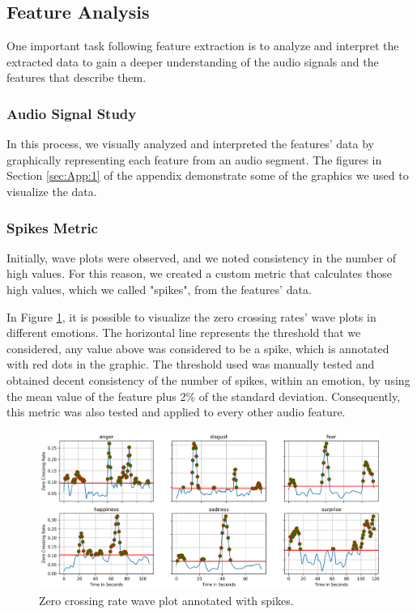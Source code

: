 \subsection{Feature Analysis}

One important task following feature extraction is to analyze and interpret the extracted data to gain a deeper understanding of the audio signals and the features that describe them.

\subsubsection{Audio Signal Study}

In this process, we visually analyzed and interpreted the features' data by graphically representing each feature from an audio segment. The figures in Section \ref{sec:App:1} of the appendix demonstrate some of the graphics we used to visualize the data.

\subsubsection{Spikes Metric}

Initially, wave plots were observed, and we noted consistency in the number of high values. For this reason, we created a custom metric that calculates those high values, which we called "spikes", from the features' data.

In Figure \ref{fig:zcrSpikes}, it is possible to visualize the zero crossing rates' wave plots in different emotions. The horizontal line represents the threshold that we considered, any value above was considered to be a spike, which is annotated with red dots in the graphic. The threshold used was manually tested and obtained decent consistency of the number of spikes, within an emotion, by using the mean value of the feature plus 2\% of the standard deviation. Consequently, this metric was also tested and applied to every other audio feature.

\begin{figure}[H]
	\centering
	\includegraphics[width=\textwidth]{figs/4_1_traditional/zcr_waveplot_spikes.png}
	\caption{Zero crossing rate wave plot annotated with spikes.}
	\label{fig:zcrSpikes}
\end{figure}


